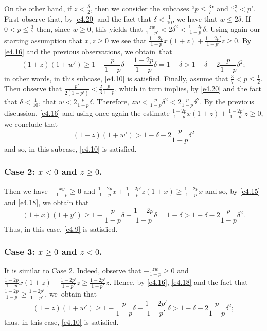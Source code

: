 \documentclass[10pt]{amsart}
\theoremstyle{remark}
\newcommand{\meg}{\geqslant}
\newcommand{\mik}{\leqslant}
\begin{document}
On the other hand, if $z<\frac{\delta}{2}$,
then we consider the subcases ``$p\mik \frac37$" and ``$\frac37<p$"\!.
First observe that, by \eqref{e4.20} and the fact that $\delta<\frac{1}{10}$, we have that $w\mik 2\delta$.
If $0<p\mik \frac{3}{7}$ then, since $w\meg 0$, this yields that
$\frac{zw}{1-p'}<2\delta^2<\frac{1-2p}{1-p}\delta$. Using again our starting assumption that
$x,z\meg 0$ we see that $\frac{1-2p}{1-p}x(1+z)+\frac{1-2p'}{1-p'}z\meg 0$. By \eqref{e4.16} and the previous
observations, we obtain~that
\begin{equation} \label{e4.24}
(1+z)(1+w')\meg 1-\frac{p}{1-p}\delta-\frac{1-2p}{1-p}\delta=
1-\delta>1-\delta-2\frac{p}{1-p}\delta^2;
\end{equation}
in other words, in this subcase, \eqref{e4.10} is satisfied. Finally, assume that $\frac37<p\mik \frac12$.
Then observe that $\frac{p'}{2(1-p')}<\frac{2}{3}\frac{p}{1-p}$, which in turn implies,
by \eqref{e4.20} and the fact that $\delta<\frac{1}{10}$, that $w< 2\frac{p}{1-p}\delta$.
Therefore, $zw<\frac{p}{1-p}\delta^2<2\frac{p}{1-p}\delta^2$. By the previous discussion,
\eqref{e4.16} and using once again the estimate $\frac{1-2p}{1-p}x(1+z)+\frac{1-2p'}{1-p'}z\meg 0$, we conclude that
\begin{equation} \label{e4.25}
(1+z)(1+w') > 1-\delta-2\frac{p}{1-p}\delta^2
\end{equation}
and so, in this subcase, \eqref{e4.10} is satisfied.

\subsubsection*{Case 2: $x<0$ and $z\meg 0$.} Then we have
$-\frac{xy}{1-p}\meg 0$ and $\frac{1-2p}{1-p}x+\frac{1-2p'}{1-p'}z(1+x)\meg \frac{1-2p}{1-p}x$
and so, by \eqref{e4.15} and \eqref{e4.18}, we obtain that
\begin{equation} \label{e4.26}
(1+x)(1+y')\meg 1-\frac{p}{1-p}\delta-\frac{1-2p}{1-p}\delta =
1-\delta>1-\delta-2\frac{p}{1-p}\delta^2.
\end{equation}
Thus, in this case, \eqref{e4.9} is satisfied.

\subsubsection*{Case 3: $x\meg 0$ and $z<0$.} It is similar to Case 2.
Indeed, observe that $-\frac{zw}{1-p}\meg 0$ and
$\frac{1-2p}{1-p}x(1+z)+\frac{1-2p'}{1-p'}z\meg \frac{1-2p'}{1-p'}z$.
Hence, by \eqref{e4.16}, \eqref{e4.18} and the fact that $\frac{1-2p}{1-p}\meg\frac{1-2p'}{1-p'}$,
we~obtain that
\begin{equation} \label{e4.27}
(1+z)(1+w')\meg 1-\frac{p}{1-p}\delta-\frac{1-2p'}{1-p'}\delta >1-\delta-2\frac{p}{1-p}\delta^2;
\end{equation}
thus, in this case, \eqref{e4.10} is satisfied.
\end{document}
